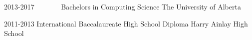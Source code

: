 \documentclass{friggeri-cv} %
\begin{document}
\begin{entrylist}


\entry
{2013-2017\ \ \ \ \ \ \ }
{Bachelors {\normalfont in Computing Science}}
{The University of Alberta}


\entry
{2011-2013}
{International Baccalaureate {\normalfont High School Diploma}}
{Harry Ainlay High School}


\end{entrylist}








\end{document}
